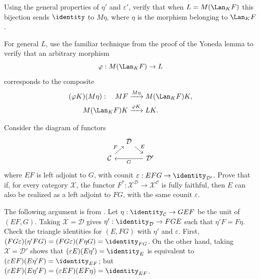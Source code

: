 \begin{Exercises}
\begin{hint}
		Using the general properties of $\eta'$ and $\varepsilon'$, verify that
		when $L=M(\Lan_KF)$ this bijection sends $\identity$ to $M\eta$, where
		$\eta$ is the morphism belonging to $\Lan_KF$.

		For general $L$, use the familiar technique from the proof of the Yoneda
		lemma to verify that an arbitrary morphism
		\[ \varphi:M(\Lan_KF)\to L \]
		corresponds to the composite
		\[
		\begin{aligned}
			(\varphi K)(M\eta):\quad MF
			&\xrightarrow{M\eta} M(\Lan_K F)K, \\
			M(\Lan_K F)K &\xrightarrow{\varphi K} LK .
		\end{aligned}
		\]
	\end{hint}

	\item Consider the diagram of functors
	\[\begin{tikzcd}[column sep=small, row sep=small]
		& \mathcal{D} \arrow[rd, "E"] & \\
		\mathcal{C} \arrow[ru, "F"] & & \mathcal{D}' \arrow[ll, "G"]
	\end{tikzcd}\]
	where $EF$ is left adjoint to $G$, with counit
	$\varepsilon:EFG\to\identity_{\mathcal{D}'}$. Prove that if, for every
	category $\mathcal{X}$, the functor
	$F^*:\mathcal{X}^{\mathcal{D}}\to\mathcal{X}^{\mathcal{C}}$ is fully
	faithful, then $E$ can also be realized as a left adjoint to $FG$, with the
	same counit $\varepsilon$.

	\begin{hint}
		The following argument is from \cite[I.1.3.1 Lemma]{GZ67}. Let
		$\eta:\identity_{\mathcal{C}}\to GEF$ be the unit of $(EF,G)$. Taking
		$\mathcal{X}=\mathcal{D}$ gives
		$\eta':\identity_{\mathcal{D}}\to FGE$ such that $\eta'F=F\eta$. Check
		the triangle identities for $(E,FG)$ with $\eta'$ and $\varepsilon$.
		First,
		$(FG\varepsilon)(\eta'FG)=(FG\varepsilon)(F\eta G)=\identity_{FG}$.
		On the other hand, taking $\mathcal{X}=\mathcal{D}'$ shows that
		$(\varepsilon E)(E\eta')=\identity_E$ is equivalent to
		$(\varepsilon EF)(E\eta'F)=\identity_{EF}$; but
		$(\varepsilon EF)(E\eta'F)=(\varepsilon EF)(EF\eta)=\identity_{EF}$.
	\end{hint}


\end{Exercises}
